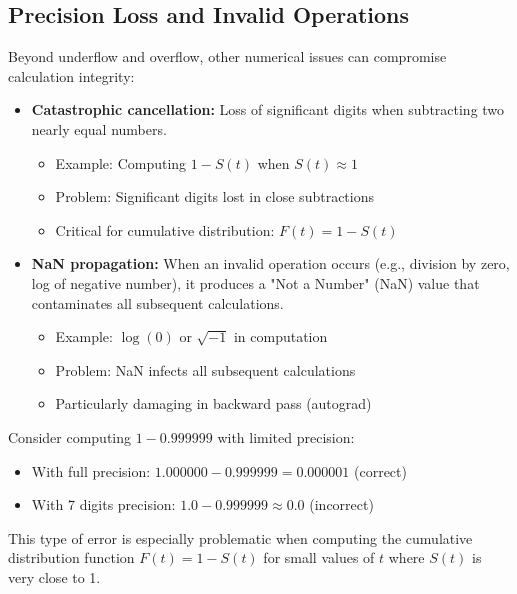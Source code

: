 \subsection{Precision Loss and Invalid Operations}

Beyond underflow and overflow, other numerical issues can compromise calculation integrity:

\begin{itemize}
    \item \textbf{Catastrophic cancellation:} Loss of significant digits when subtracting two nearly equal numbers.
    \begin{itemize}
        \item Example: Computing $1 - S(t)$ when $S(t) \approx 1$
        \item Problem: Significant digits lost in close subtractions
        \item Critical for cumulative distribution: $F(t) = 1 - S(t)$
    \end{itemize}

    \item \textbf{NaN propagation:} When an invalid operation occurs (e.g., division by zero, log of negative number), it produces a "Not a Number" (NaN) value that contaminates all subsequent calculations.
    \begin{itemize}
        \item Example: $\log(0)$ or $\sqrt{-1}$ in computation
        \item Problem: NaN infects all subsequent calculations
        \item Particularly damaging in backward pass (autograd)
    \end{itemize}
\end{itemize}

\begin{examplebox}[title=Catastrophic Cancellation Example]
Consider computing $1 - 0.999999$ with limited precision:
\begin{itemize}
    \item With full precision: $1.000000 - 0.999999 = 0.000001$ (correct)
    \item With 7 digits precision: $1.0 - 0.999999 \approx 0.0$ (incorrect)
\end{itemize}
This type of error is especially problematic when computing the cumulative distribution function $F(t) = 1 - S(t)$ for small values of $t$ where $S(t)$ is very close to 1.
\end{examplebox}

